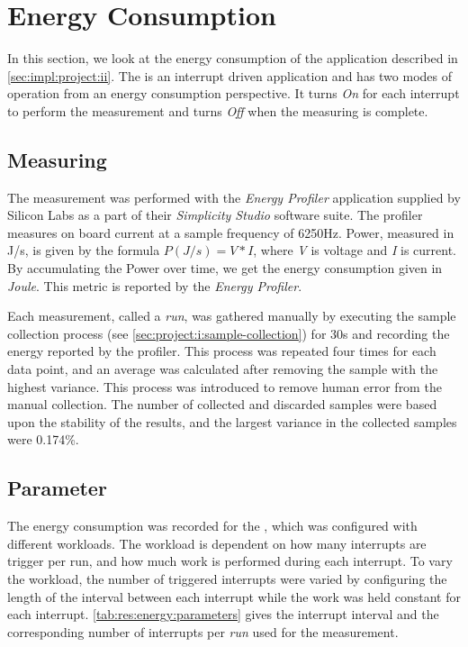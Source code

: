 \section{Energy Consumption}
\label{sec:res:energy}

In this section, we look at the energy consumption of the {\tracker} application described in \autoref{sec:impl:project:ii}.
The {\tracker} is an interrupt driven application and has two modes of operation from an energy consumption perspective.
It turns \emph{On} for each interrupt to perform the measurement and turns \emph{Off} when the measuring is complete.

\subsection{Measuring}
The measurement was performed with the \emph{Energy Profiler} application supplied by Silicon Labs as a part of their \emph{Simplicity Studio} software suite.
The profiler measures on board current at a sample frequency of 6250Hz.
Power, measured in J/s, is given by the formula $P (J/s) = V*I $, where \emph{V} is voltage and \emph{I} is current.
By accumulating the Power over time, we get the energy consumption given in \emph{Joule}.
This metric is reported by the \emph{Energy Profiler}.

Each measurement, called a \emph{run}, was gathered manually by executing the sample collection process (see \autoref{sec:project:i:sample-collection}) for 30s and recording the energy reported by the profiler.
This process was repeated four times for each data point, and an average was calculated after removing the sample with the highest variance.
This process was introduced to remove human error from the manual collection.
The number of collected and discarded samples were based upon the stability of the results, and the largest variance in the collected samples were 0.174\%.

\subsection{Parameter}

The energy consumption was recorded for the {\tracker}, which was configured with different workloads.
The workload is dependent on how many interrupts are trigger per run, and how much work is performed during each interrupt.
To vary the workload, the number of triggered interrupts were varied by configuring the length of the interval between each interrupt while the work was held constant for each interrupt.
\autoref{tab:res:energy:parameters} gives the interrupt interval and the corresponding number of interrupts per \emph{run} used for the measurement.


